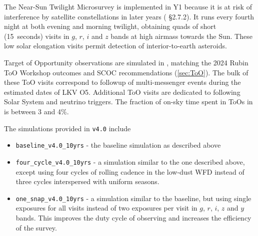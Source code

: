 The Near-Sun Twilight Microsurvey is implemented in Y1 because it is at risk of interference by satellite constellations in later years ( \S2.7.2). It runs every fourth night at both evening and morning twilight, obtaining quads of short (15~seconds) visits in $g$, $r$, $i$ and $z$ bands at high airmass towards the Sun. These low solar elongation visits permit detection of interior-to-earth asteroids. %

Target of Opportunity observations are simulated in , matching the 2024 Rubin ToO Workshop outcomes and SCOC recommendations (\autoref{sec:ToO}). The bulk of these ToO visits correspond to followup of multi-messenger events during the estimated dates of LKV O5. Additional ToO visits are dedicated to following Solar System and neutrino triggers. The fraction of on-sky time spent in ToOs in  is between 3 and 4\%. 

The simulations provided in \texttt{v4.0} include
\begin{itemize}
    \item \texttt{baseline\_v4.0\_10yrs} - the baseline simulation as described above
    \item \texttt{four\_cycle\_v4.0\_10yrs} - a simulation similar to the one described above, except using four cycles of rolling cadence in the low-dust WFD instead of three cycles interspersed with uniform seasons. 
    \item \texttt{one\_snap\_v4.0\_10yrs} - a simulation similar to the baseline, but using single exposures for all visits instead of two exposures per visit in $g$, $r$, $i$, $z$ and $y$ bands. This improves the duty cycle of observing and increases the efficiency of the survey.
\end{itemize}

